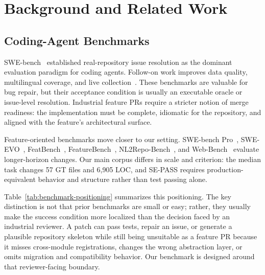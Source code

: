 \section{Background and Related Work}
\label{sec:background}
\label{sec:related}

\subsection{Coding-Agent Benchmarks}

SWE-bench~\cite{jimenez2024swebench,chowdhury2024swebenchverified} established real-repository issue resolution as the dominant evaluation paradigm for coding agents. Follow-on work improves data quality, multilingual coverage, and live collection~\cite{aleithan2024swebenchplus,badertdinov2025swerebench,multiswebench,zan2024swebenchjava,swebenchlive}. These benchmarks are valuable for bug repair, but their acceptance condition is usually an executable oracle or issue-level resolution. Industrial feature PRs require a stricter notion of merge readiness: the implementation must be complete, idiomatic for the repository, and aligned with the feature's architectural surface.

Feature-oriented benchmarks move closer to our setting. SWE-bench Pro~\cite{swebenchpro2025}, SWE-EVO~\cite{sweevo}, FeatBench~\cite{featbench2025}, FeatureBench~\cite{zhou2026featurebench}, NL2Repo-Bench~\cite{ding2025nl2repo}, and Web-Bench~\cite{xu2025webbench} evaluate longer-horizon changes. Our main corpus differs in scale and criterion: the median task changes 57 GT files and 6{,}905 LOC, and SE-PASS requires production-equivalent behavior and structure rather than test passing alone.

Table~\ref{tab:benchmark-positioning} summarizes this positioning. The key distinction is not that prior benchmarks are small or easy; rather, they usually make the success condition more localized than the decision faced by an industrial reviewer. A patch can pass tests, repair an issue, or generate a plausible repository skeleton while still being unsuitable as a feature PR because it misses cross-module registrations, changes the wrong abstraction layer, or omits migration and compatibility behavior. Our benchmark is designed around that reviewer-facing boundary.

